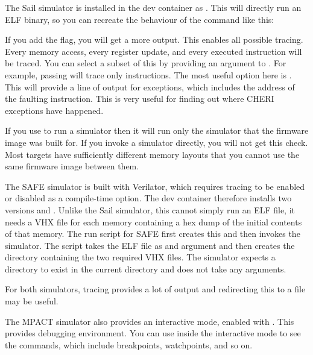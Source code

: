 The Sail simulator is installed in the dev container as .
This will directly run an ELF binary, so you can recreate the behaviour of the  command like this:


If you add the  flag, you will get a  more output.
This enables all possible tracing.
Every memory access, every register update, and every executed instruction will be traced.
You can select a subset of this by providing an argument to .
For example, passing  will trace only instructions.
The most useful option here is .
This will provide a line of output for exceptions, which includes the address of the faulting instruction.
This is very useful for finding out where CHERI exceptions have happened.

\begin{caution}
	If you use  to run a simulator then it will run only the simulator that the firmware image was built for.
	If you invoke a simulator directly, you will not get this check.
	Most targets have sufficiently different memory layouts that you cannot use the same firmware image between them.
\end{caution}

The SAFE simulator is built with Verilator, which requires tracing to be enabled or disabled as a compile-time option.
The dev container therefore installs two versions  and .
Unlike the Sail simulator, this cannot simply run an ELF file, it needs a VHX file for each memory containing a hex dump of the initial contents of that memory.
The run script for SAFE first creates this and then invokes the simulator.
The  script takes the ELF file as and argument and then creates the  directory containing the two required VHX files.
The simulator expects a  directory to exist in the current directory and does not take any arguments.

For both simulators, tracing provides a lot of output and redirecting this to a file may be useful.

The MPACT simulator also provides an interactive mode, enabled with .
This provides debugging environment.
You can use  inside the interactive mode to see the commands, which include breakpoints, watchpoints, and so on.